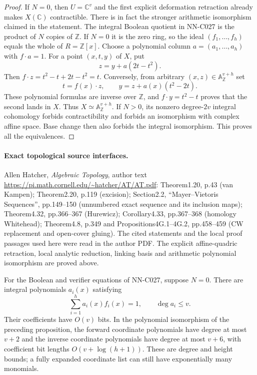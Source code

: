 \begin{proof}
If $N=0$, then $U=\mathbb C^v$ and the first explicit deformation
retraction already makes $X(\mathbb C)$ contractible. There is in
fact the stronger arithmetic isomorphism claimed in the statement.
The integral Boolean quotient in NN-C027 is the product of $N$
copies of $\mathbb Z$. If $N=0$ it is the zero ring, so the ideal
$(f_1,\ldots,f_h)$ equals the whole of $R=\mathbb Z[x]$.
Choose a polynomial column $a=(a_1,\ldots,a_h)$ with $f\cdot a=1$.
For a point $(x,t,y)$ of $X$, put
\[
                         z=y+a(2t-t^2).
\]
Then $f\cdot z=t^2-t+2t-t^2=t$. Conversely, from arbitrary
$(x,z)\in\mathbb A^{v+h}_{\mathbb Z}$ set
\[
             t=f(x)\cdot z,\qquad y=z+a(x)(t^2-2t).
\]
These polynomial formulas are inverse over $\mathbb Z$, and
$f\cdot y=t^2-t$ proves that the second lands in $X$.
Thus $X\simeq\mathbb A^{v+h}_{\mathbb Z}$.
If $N>0$, its nonzero degree-$2v$ integral cohomology forbids
contractibility and forbids an isomorphism with complex affine
space. Base change then also forbids the integral isomorphism.
This proves all the equivalences.
\end{proof}

\paragraph{Exact topological source interfaces.}
Allen Hatcher, \emph{Algebraic Topology}, author text
\url{https://pi.math.cornell.edu/~hatcher/AT/AT.pdf}:
Theorem1.20, p.43 (van Kampen);
Theorem2.20, p.119 (excision);
Section2.2, ``Mayer--Vietoris Sequences'', pp.149--150 (unnumbered
exact sequence and its inclusion maps);
Theorem4.32, pp.366--367 (Hurewicz);
Corollary4.33, pp.367--368 (homology Whitehead);
Theorem4.8, p.349 and Propositions4G.1--4G.2, pp.458--459
(CW replacement and open-cover gluing).
The cited statements and the local proof passages used here were
read in the author PDF. The explicit affine-quadric retraction,
local analytic reduction, linking basis and arithmetic polynomial
isomorphism are proved above.

\begin{proposition}
For the Boolean and verifier equations of NN-C027, suppose $N=0$.
There are integral polynomials $a_i(x)$ satisfying
\[
                      \sum_{i=1}^h a_i(x)f_i(x)=1,
 \qquad \deg a_i\leq v.
\]
Their coefficients have $O(v)$ bits. In the polynomial isomorphism
of the preceding proposition, the forward coordinate polynomials have
degree at most $v+2$ and the inverse coordinate polynomials have
degree at most $v+6$, with coefficient bit lengths $O(v+\log(h+1))$.
These are degree and height bounds; a fully expanded coordinate
list can still have exponentially many monomials.
\end{proposition}

